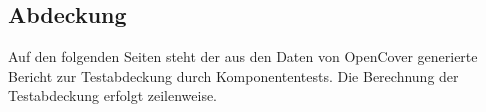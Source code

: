 %






\subsection{Abdeckung}
\label{Abschnitt:Tests:Statistik:Abdeckung}


Auf den folgenden Seiten steht der aus den Daten von OpenCover generierte Bericht zur Testabdeckung durch Komponententests.
Die Berechnung der Testabdeckung erfolgt zeilenweise.



\thispagestyle{empty}
\pagestyle{empty}

\begin{figure}[h!]

   
\end{figure}


